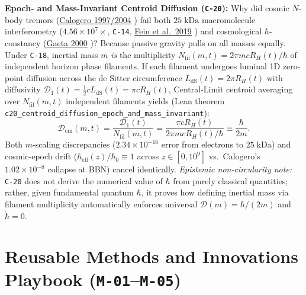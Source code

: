 \documentclass[11pt,letterpaper]{article}
\begin{document}
\textbf{Epoch- and Mass-Invariant Centroid Diffusion (\texttt{C-20}):} Why did cosmic $N$-body tremors (\href{https://www.worldscientific.com/doi/abs/10.1142/S0217979204024136}{Calogero 1997/2004} \cite{Calogero2004}) fail both $25\;\mathrm{kDa}$ macromolecule interferometry ($4.56\times 10^7\times$, \texttt{C-14}, \href{https://www.researchgate.net/publication/335990763_Quantum_superposition_of_molecules_beyond_25_kDa}{Fein et al.\ 2019} \cite{Fein2019}) and cosmological $\hbar$-constancy (\href{https://www.worldscientific.com/doi/10.1142/S0217732300001614}{Gaeta 2000} \cite{Gaeta2000})? Because passive gravity pulls on all masses equally. Under \texttt{C-18}, inertial mass $m$ \emph{is} the multiplicity $N_{\mathrm{fil}}(m,t) = 2\pi m c R_H(t)/\hbar$ of independent horizon phase filaments. If each filament undergoes luminal 1D zero-point diffusion across the de Sitter circumference $L_{\mathrm{dS}}(t) = 2\pi R_H(t)$ with diffusivity $\mathcal{D}_1(t) = \frac{1}{2} c L_{\mathrm{dS}}(t) = \pi c R_H(t)$, Central-Limit centroid averaging over $N_{\mathrm{fil}}(m,t)$ independent filaments yields (Lean theorem \texttt{c20\_centroid\_diffusion\_epoch\_and\_mass\_invariant}):
\begin{equation}
  \mathcal{D}_{\mathrm{cm}}(m, t) = \frac{\mathcal{D}_1(t)}{N_{\mathrm{fil}}(m, t)}
  = \frac{\pi c R_H(t)}{2\pi m c R_H(t)/\hbar} \equiv \frac{\hbar}{2m}.
\end{equation}
Both $m$-scaling discrepancies ($2.34\times 10^{-16}$ error from electrons to $25\;\mathrm{kDa}$) and cosmic-epoch drift ($\hbar_{\mathrm{eff}}(z)/\hbar_0 \equiv 1$ across $z \in [0, 10^9]$ vs.\ Calogero's $1.02\times 10^{-8}$ collapse at BBN) cancel identically. \emph{Epistemic non-circularity note:} \texttt{C-20} does not derive the numerical value of $\hbar$ from purely classical quantities; rather, given fundamental quantum $\hbar$, it proves how defining inertial mass via filament multiplicity automatically enforces universal $\mathcal{D}(m) = \hbar/(2m)$ and $\dot{\hbar} = 0$.

\section{Reusable Methods and Innovations Playbook (\texttt{M-01}--\texttt{M-05})}
\end{document}
